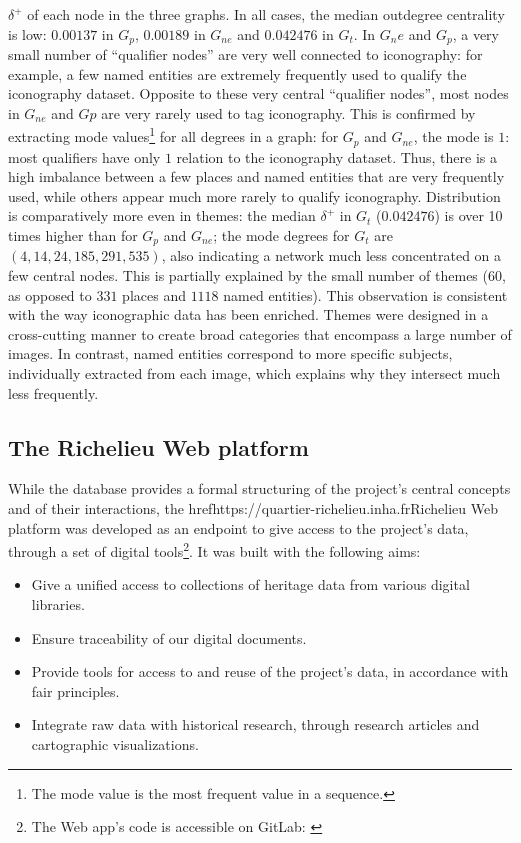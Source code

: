 \documentclass[12pt, a4paper, twocolumn]{article}
\begin{document}
{} $\delta^+$ of each node in the three graphs. In all cases, the median outdegree centrality is low: $0.00137$ in $G_p$, $0.00189$ in $G_{ne}$ and  $0.042476$ in $G_t$. In $G_ne$ and $G_p$, a very small number of ``qualifier nodes'' are very well connected to iconography: for example, a few named entities are extremely frequently used to qualify the iconography dataset. Opposite to these very central ``qualifier nodes'', most nodes in $G_{ne}$ and $G{p}$ are very rarely used to tag iconography. This is confirmed by extracting mode values\footnote{The mode value is the most frequent value in a sequence.} for all degrees in a graph: for $G_p$ and $G_{ne}$, the mode is $1$: most qualifiers have only $1$ relation to the iconography dataset. Thus, there is a high imbalance between a few places and named entities that are very frequently used, while others appear much more rarely to qualify iconography. Distribution is comparatively more even in themes: the median $\delta^+$ in $G_t$ ($0.042476$) is over 10 times higher than for $G_p$ and $G_{ne}$; the mode degrees for $G_t$ are $(4, 14, 24, 185, 291, 535)$, also indicating a network much less concentrated on a few central nodes. This is partially explained by the small number of themes ($60$, as opposed to $331$ places and $1118$ named entities). This observation is consistent with the way iconographic data has been enriched. Themes were designed in a cross-cutting manner to create broad categories that encompass a large number of images. In contrast, named entities correspond to more specific subjects, individually extracted from each image, which explains why they intersect much less frequently.

\subsection{The Richelieu Web platform}

While the database provides a formal structuring of the project's central concepts and of their interactions, the href{https://quartier-richelieu.inha.fr}{Richelieu Web platform} was developed as an endpoint to give access to the project's data, through a set of digital tools\footnote{The Web app's code is accessible on GitLab: \cite{kervegan_richelieu_2024}}. It was built with the following aims:

\begin{itemize}
    \item Give a unified access to collections of heritage data from various digital libraries.
    \item Ensure traceability of our digital documents.
    \item Provide tools for access to and reuse of the project's data, in accordance with \acs{fair} principles.
    \item Integrate raw data with historical research, through research articles and cartographic visualizations.
\end{itemize}
\end{document}
